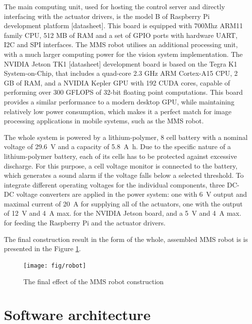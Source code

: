 The main computing unit, used for hosting the control server and directly interfacing with the actuator drivers, is the model B of Raspberry Pi development platform [datasheet]. This board is equipped with 700Mhz ARM11 family CPU, 512 MB of RAM and a set of GPIO ports with hardware UART, I2C and SPI interfaces. The MMS robot utilises an additional processing unit, with a much larger computing power for the vision system implementation. The NVIDIA Jetson TK1 [datasheet] development board is based on the Tegra K1 System-on-Chip, that includes a quad-core 2.3 GHz ARM Cortex-A15 CPU, 2 GB of RAM, and a NVIDIA Kepler GPU with 192 CUDA cores, capable of performing over 300 GFLOPS of 32-bit floating point computations. This board provides a similar performance to a modern desktop GPU, while maintaining relatively low power consumption, which makes it a perfect match for image processing applications in mobile systems, such as the MMS robot.

The whole system is powered by a lithium-polymer, 8 cell battery with a nominal voltage of \SI{29.6}{\volt} and a capacity of \SI{5.8}{\ampere\hour}. Due to the specific nature of a lithium-polymer battery, each of its cells has to be protected against excessive discharge. For this purpose, a cell voltage monitor is connected to the battery, which generates a sound alarm if the voltage falls below a selected threshold. To integrate different operating voltages for the individual components, three DC-DC voltage converters are applied in the power system: one with \SI{6}{\volt} output and maximal current of \SI{20}{\ampere} for supplying all of the actuators, one with the output of \SI{12}{\volt} and \SI{4}{\ampere} max. for the NVIDIA Jetson board, and a \SI{5}{\volt} and \SI{4}{\ampere} max. for feeding the Raspberry Pi and the actuator drivers.

The final construction result in the form of the whole, assembled MMS robot is  is presented in the Figure \ref{fig:assembled}.

\begin{figure}[H]
\centering
\texttt{[image: fig/robot]}
\caption{The final effect of the MMS robot construction}
\label{fig:assembled}
\end{figure}

\section{Software architecture}
\label{sec:soft}


